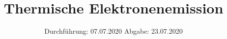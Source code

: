 

\subject{504}
\title{Thermische Elektronenemission}
\date{%
  Durchführung: 07.07.2020
  \hspace{3em}
  Abgabe: 23.07.2020
}



\maketitle
\thispagestyle{empty}
\tableofcontents
\newpage






\nocite{V504}
\printbibliography{}



